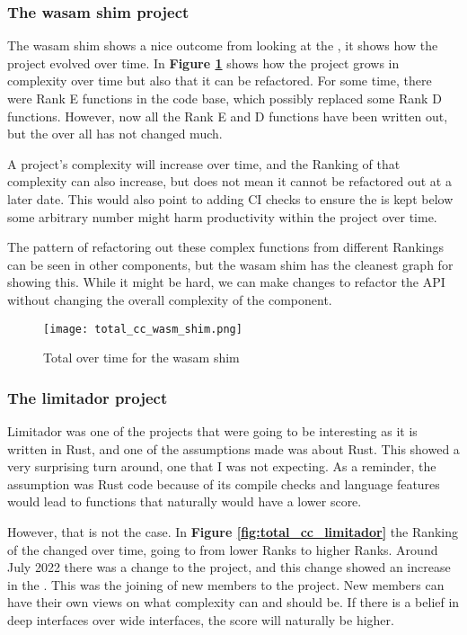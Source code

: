 \subsubsection{The wasam shim project}
The wasam shim shows a nice outcome from looking at the \ccnsp, it shows how the project evolved over time.
In \textbf{Figure \ref{fig:total_cc_wasam_shim}} shows how the project grows in complexity over time but also that it can be refactored.
For some time, there were Rank E functions in the code base, which possibly replaced some Rank D functions.
However, now all the Rank E and D functions have been written out, but the over all \cc has not changed much.

A project's complexity will increase over time, and the Ranking of that complexity can also increase, but does not mean it cannot be refactored out at a later date.
This would also point to adding CI checks to ensure the \cc is kept below some arbitrary number might harm productivity within the project over time.

The pattern of refactoring out these complex functions from different Rankings can be seen in other components, but the wasam shim has the cleanest graph for showing this.
While it might be hard, we can make changes to refactor the API without changing the overall complexity of the component.
\begin{figure}
	\texttt{[image: total\_cc\_wasm\_shim.png]}
	\caption{Total \cc over time for the wasam shim}
	\label{fig:total_cc_wasam_shim}
\end{figure}

\subsubsection{The limitador project}
Limitador was one of the projects that were going to be interesting as it is written in Rust, and one of the assumptions made was about Rust.
This showed a very surprising turn around, one that I was not expecting.
As a reminder, the assumption was Rust code because of its compile checks and language features would lead to functions that naturally would have a lower \cc score.

However, that is not the case.
In \textbf{Figure \ref{fig:total_cc_limitador}} the Ranking of the \cc changed over time, going to from lower Ranks to higher Ranks.
Around July 2022 there was a change to the project, and this change showed an increase in the \cc.
This was the joining of new members to the project.
New members can have their own views on what complexity can and should be.
If there is a belief in deep interfaces over wide interfaces, the \cc score will naturally be higher.

